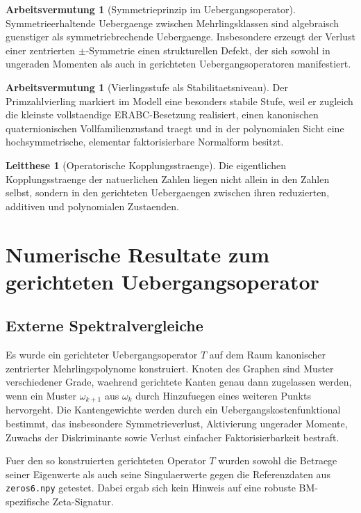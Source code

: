 \documentclass[11pt,a4paper]{article}
\theoremstyle{definition}
\newtheorem{arbeitsvermutung}[satz]{Arbeitsvermutung}
\newtheorem{leitthese}[satz]{Leitthese}
\begin{document}
\begin{arbeitsvermutung}[Symmetrieprinzip im Uebergangsoperator]
Symmetrieerhaltende Uebergaenge zwischen Mehrlingsklassen sind algebraisch guenstiger als symmetriebrechende Uebergaenge. Insbesondere erzeugt der Verlust einer zentrierten \(\pm\)-Symmetrie einen strukturellen Defekt, der sich sowohl in ungeraden Momenten als auch in gerichteten Uebergangsoperatoren manifestiert.
\end{arbeitsvermutung}

\begin{arbeitsvermutung}[Vierlingsstufe als Stabilitaetsniveau]
Der Primzahlvierling markiert im Modell eine besonders stabile Stufe, weil er zugleich die kleinste vollstaendige ERABC-Besetzung realisiert, einen kanonischen quaternionischen Vollfamilienzustand traegt und in der polynomialen Sicht eine hochsymmetrische, elementar faktorisierbare Normalform besitzt.
\end{arbeitsvermutung}

\begin{leitthese}[Operatorische Kopplungsstraenge]
Die eigentlichen Kopplungsstraenge der natuerlichen Zahlen liegen nicht allein in den Zahlen selbst, sondern in den gerichteten Uebergaengen zwischen ihren reduzierten, additiven und polynomialen Zustaenden.
\end{leitthese}

\section{Numerische Resultate zum gerichteten Uebergangsoperator}

\subsection{Externe Spektralvergleiche}

Es wurde ein gerichteter Uebergangsoperator \(T\) auf dem Raum kanonischer zentrierter Mehrlingspolynome konstruiert. Knoten des Graphen sind Muster verschiedener Grade, waehrend gerichtete Kanten genau dann zugelassen werden, wenn ein Muster \(\omega_{k+1}\) aus \(\omega_k\) durch Hinzufuegen eines weiteren Punkts hervorgeht. Die Kantengewichte werden durch ein Uebergangskostenfunktional bestimmt, das insbesondere Symmetrieverlust, Aktivierung ungerader Momente, Zuwachs der Diskriminante sowie Verlust einfacher Faktorisierbarkeit bestraft.

Fuer den so konstruierten gerichteten Operator \(T\) wurden sowohl die Betraege seiner Eigenwerte als auch seine Singulaerwerte gegen die Referenzdaten aus \texttt{zeros6.npy} getestet. Dabei ergab sich kein Hinweis auf eine robuste BM-spezifische Zeta-Signatur.
\end{document}
